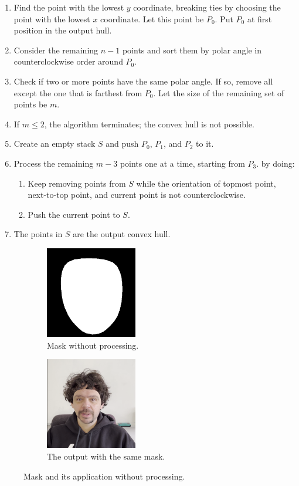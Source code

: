 \documentclass[preprint]{elsarticle}
\begin{document}
\begin{enumerate}
	\item Find the point with the lowest $y$ coordinate, breaking ties by choosing the point with the lowest $x$ coordinate. 
	Let this point be $P_0$. Put $P_0$ at first position in the output hull.
	\item Consider the remaining $n-1$ points and sort them by polar angle in counterclockwise order around $P_0$.
	\item Check if two or more points have the same polar angle. If so, remove all except the one that is farthest from $P_0$. 
	Let the size of the remaining set of points be $m$.
	\item If $m \leq 2$, the algorithm terminates; the convex hull is not possible.
	\item Create an empty stack $S$ and push $P_0$, $P_1$, and $P_2$ to it.
	\item Process the remaining $m-3$ points one at a time, starting from $P_3$. by doing:
	\begin{enumerate}
		\item Keep removing points from $S$ while the orientation of topmost point, next-to-top point, and current point is not counterclockwise.
		\item Push the current point to $S$.
	\end{enumerate}
	\item The points in $S$ are the output convex hull.
\end{enumerate}

\begin{figure}[H]
	\centering
	\begin{subfigure}[b]{0.5\textwidth}
		\centering
		\includegraphics[width=4cm, keepaspectratio]{img/project_img/mask.png}
		\caption{Mask without processing.}\label{fig:mask-noblur}
	\end{subfigure}%
	\hfill
	\begin{subfigure}[b]{0.5\textwidth}
		\centering
		\includegraphics[width=4cm, keepaspectratio]{img/project_img/final-erorr.png}
		\caption{The output with the same mask.}\label{fig:mask-final-error}
	\end{subfigure}
	\caption{Mask and its application without processing.}\label{fig:eroor-mediapipe}
\end{figure}
\end{document}

